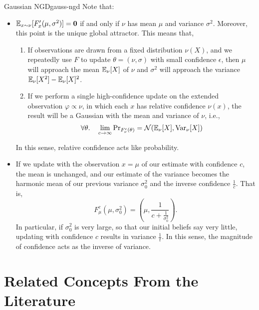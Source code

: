 \documentclass{article}
\begin{document}
\begin{examplex}{Gaussian NGD}{gauss-ngd}
	Note that:
	\begin{itemize}
		\item  $\operatorname*{\mathbb{E}}_{x \sim \nu} [ F'_x(\mu,\sigma^2) ] = \mathbf{0}$ if and only if $\nu$ has mean $\mu$ and variance $\sigma^2$.
		Moreover, this point is the unique global attractor.
		This means that,
		\begin{enumerate}
			\item If observations are drawn from a fixed distribution $\nu(X)$, and we repeatedly use $F$ to update $\theta = (\nu, \sigma)$ with small confidence $\epsilon$,
			then $\mu$ will approach the mean $\operatorname*{\mathbb{E}}_{\nu}[X]$ of $\nu$
			and $\sigma^2$ will approach the variance $\operatorname*{\mathbb{E}}_{\nu}[X^2] - \operatorname*{\mathbb{E}}_{\nu}[X]^2$.

			\item If we perform a single high-confidence update on the extended observation $\varphi \propto \nu$, in which each $x$ has relative confidence $\nu(x)$, the result will be a Gaussian with the mean and variance of $\nu$, i.e.,
			\[
				\forall \theta.\quad
				\lim_{c \to \infty} \Pr\nolimits_{F_{\nu}^c(\theta)} = \mathcal N(\operatorname*{\mathbb{E}}\nolimits_{\nu}[X], {\mathrm{Var}}_{\nu}[X])
			\]
		\end{enumerate}
		In this sense, relative confidence acts like probability.

		\item
		If we update with the observation $x = \mu$ of our estimate with confidence $c$,
		the mean is unchanged, and our estimate of the variance becomes the harmonic mean of our previous variance $\sigma_0^2$ and the inverse confidence $\frac1c$.
		That is,
		\[
			F^c_\mu(\mu, \sigma_0^2) =
			\left(\mu, \frac{1}{c + \frac{1}{\sigma_0^2}} \right).
		\]
		In particular, if $\sigma_0^2$ is very large, so that our initial beliefs say very little, updating with confidence $c$ results in variance $\frac1t$.
		In this sense, the magnitude of confidence acts as the inverse of variance.
	\end{itemize}
\end{examplex}


\section{Related Concepts From the Literature}
\end{document}
